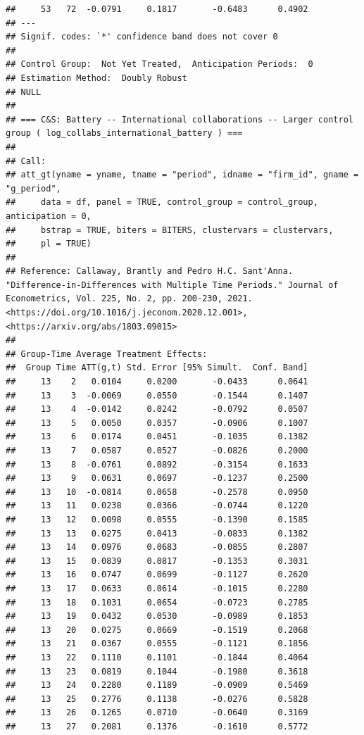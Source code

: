 \documentclass[
]{article}
\begin{document}
\begin{verbatim}
##     53   72  -0.0791     0.1817       -0.6483      0.4902  
## ---
## Signif. codes: `*' confidence band does not cover 0
## 
## Control Group:  Not Yet Treated,  Anticipation Periods:  0
## Estimation Method:  Doubly Robust
## NULL
## 
## === C&S: Battery -- International collaborations -- Larger control group ( log_collabs_international_battery ) ===
## 
## Call:
## att_gt(yname = yname, tname = "period", idname = "firm_id", gname = "g_period", 
##     data = df, panel = TRUE, control_group = control_group, anticipation = 0, 
##     bstrap = TRUE, biters = BITERS, clustervars = clustervars, 
##     pl = TRUE)
## 
## Reference: Callaway, Brantly and Pedro H.C. Sant'Anna.  "Difference-in-Differences with Multiple Time Periods." Journal of Econometrics, Vol. 225, No. 2, pp. 200-230, 2021. <https://doi.org/10.1016/j.jeconom.2020.12.001>, <https://arxiv.org/abs/1803.09015> 
## 
## Group-Time Average Treatment Effects:
##  Group Time ATT(g,t) Std. Error [95% Simult.  Conf. Band]  
##     13    2   0.0104     0.0200       -0.0433      0.0641  
##     13    3  -0.0069     0.0550       -0.1544      0.1407  
##     13    4  -0.0142     0.0242       -0.0792      0.0507  
##     13    5   0.0050     0.0357       -0.0906      0.1007  
##     13    6   0.0174     0.0451       -0.1035      0.1382  
##     13    7   0.0587     0.0527       -0.0826      0.2000  
##     13    8  -0.0761     0.0892       -0.3154      0.1633  
##     13    9   0.0631     0.0697       -0.1237      0.2500  
##     13   10  -0.0814     0.0658       -0.2578      0.0950  
##     13   11   0.0238     0.0366       -0.0744      0.1220  
##     13   12   0.0098     0.0555       -0.1390      0.1585  
##     13   13   0.0275     0.0413       -0.0833      0.1382  
##     13   14   0.0976     0.0683       -0.0855      0.2807  
##     13   15   0.0839     0.0817       -0.1353      0.3031  
##     13   16   0.0747     0.0699       -0.1127      0.2620  
##     13   17   0.0633     0.0614       -0.1015      0.2280  
##     13   18   0.1031     0.0654       -0.0723      0.2785  
##     13   19   0.0432     0.0530       -0.0989      0.1853  
##     13   20   0.0275     0.0669       -0.1519      0.2068  
##     13   21   0.0367     0.0555       -0.1121      0.1856  
##     13   22   0.1110     0.1101       -0.1844      0.4064  
##     13   23   0.0819     0.1044       -0.1980      0.3618  
##     13   24   0.2280     0.1189       -0.0909      0.5469  
##     13   25   0.2776     0.1138       -0.0276      0.5828  
##     13   26   0.1265     0.0710       -0.0640      0.3169  
##     13   27   0.2081     0.1376       -0.1610      0.5772  

\end{verbatim}
\end{document}
